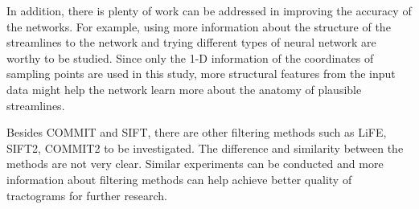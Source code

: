 In addition, there is plenty of work can be addressed in improving the accuracy of the networks.
For example, using more information about the structure of the streamlines to the network
and trying different types of neural network are worthy to be studied. Since only the 1-D information of the 
coordinates of sampling points are used in this study, more structural features from the input data might 
help the network learn more about the anatomy of plausible streamlines.

Besides COMMIT and SIFT, there are other filtering methods such as LiFE, SIFT2, COMMIT2 to be investigated.
The difference and similarity between the methods are not very clear. Similar experiments can be conducted and 
more information about filtering methods can help achieve better quality of tractograms for further research.






